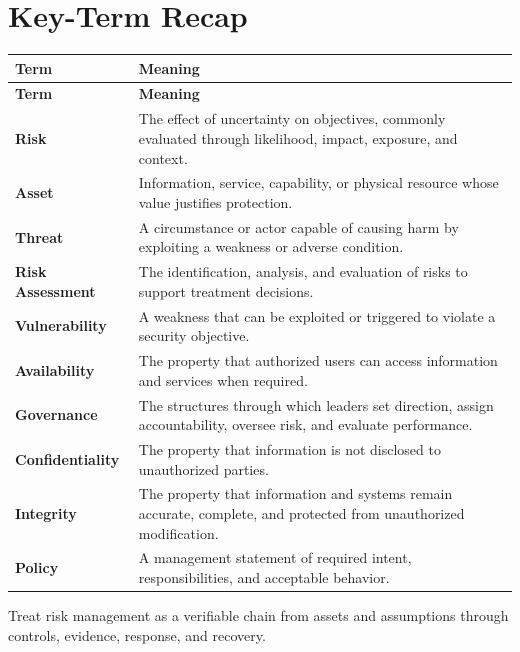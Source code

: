 \documentclass[11pt]{article}
\begin{document}
\section*{Key-Term Recap}
\begin{longtable}{>{\RaggedRight\arraybackslash}p{}>{\RaggedRight\arraybackslash}p{}}
\toprule\rowcolor{Navy}\color{white}\textbf{Term} & \color{white}\textbf{Meaning}\\\midrule
\endfirsthead
\toprule\rowcolor{Navy}\color{white}\textbf{Term} & \color{white}\textbf{Meaning}\\\midrule
\endhead
\textbf{Risk} & The effect of uncertainty on objectives, commonly evaluated through likelihood, impact, exposure, and context. \\\midrule
\textbf{Asset} & Information, service, capability, or physical resource whose value justifies protection. \\\midrule
\textbf{Threat} & A circumstance or actor capable of causing harm by exploiting a weakness or adverse condition. \\\midrule
\textbf{Risk Assessment} & The identification, analysis, and evaluation of risks to support treatment decisions. \\\midrule
\textbf{Vulnerability} & A weakness that can be exploited or triggered to violate a security objective. \\\midrule
\textbf{Availability} & The property that authorized users can access information and services when required. \\\midrule
\textbf{Governance} & The structures through which leaders set direction, assign accountability, oversee risk, and evaluate performance. \\\midrule
\textbf{Confidentiality} & The property that information is not disclosed to unauthorized parties. \\\midrule
\textbf{Integrity} & The property that information and systems remain accurate, complete, and protected from unauthorized modification. \\\midrule
\textbf{Policy} & A management statement of required intent, responsibilities, and acceptable behavior. \\\midrule
\bottomrule
\end{longtable}
\begin{takeawaybox}
Treat risk management as a verifiable chain from assets and assumptions through controls, evidence, response, and recovery.
\end{takeawaybox}
\end{document}
